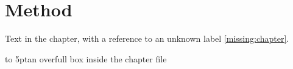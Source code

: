 \section{Method}\label{sec:method}
Text in the chapter, with a reference to an unknown label \ref{missing:chapter}.

\hbox to 5pt{an overfull box inside the chapter file}
